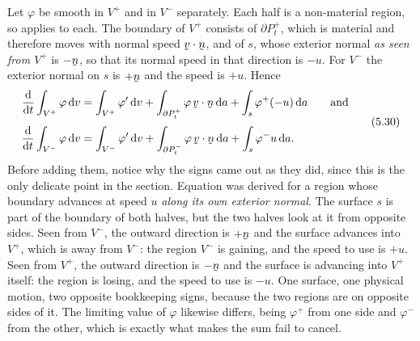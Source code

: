 Let $\varphi$ be smooth in $V^{+}$ and in $V^{-}$ separately. Each half is
a non-material region, so  applies to each. The boundary of
$V^{+}$ consists of $\partial P_{t}^{+}$, which is material and therefore
moves with normal speed $\ip\bv\bn$, and of $s$, whose exterior normal
\emph{as seen from $V^{+}$} is $-\bn$, so that its normal speed in that
direction is $-u$. For $V^{-}$ the exterior normal on $s$ is $+\bn$ and
the speed is $+u$. Hence
\begin{equation}
\begin{aligned}
   \frac{\dl}{\dl t}\int_{V^{+}}\varphi\,\dl v
   &=\int_{V^{+}}\varphi'\,\dl v
    +\int_{\partial P^{+}_{t}}\varphi\,\ip\bv\bn\,\dl a
    +\int_{s}\varphi^{+}(-u)\,\dl a
   \qquad\text{and}\\[1mm]
   \frac{\dl}{\dl t}\int_{V^{-}}\varphi\,\dl v
   &=\int_{V^{-}}\varphi'\,\dl v
    +\int_{\partial P^{-}_{t}}\varphi\,\ip\bv\bn\,\dl a
    +\int_{s}\varphi^{-}u\,\dl a .
\end{aligned}
   \tag{5.30}\label{eq:5.30}
\end{equation}
Before adding them, notice why the signs came out as they did, since this
is the only delicate point in the section. Equation  was derived
for a region whose boundary advances at speed $u$ \emph{along its own
exterior normal}. The surface $s$ is part of the boundary of both halves,
but the two halves look at it from opposite sides. Seen from $V^{-}$, the
outward direction is $+\bn$ and the surface advances into $V^{+}$, which
is away from $V^{-}$: the region $V^{-}$ is gaining, and the speed to use
is $+u$. Seen from $V^{+}$, the outward direction is $-\bn$ and the
surface is advancing into $V^{+}$ itself: the region is losing, and the
speed to use is $-u$. One surface, one physical motion, two opposite
bookkeeping signs, because the two regions are on opposite sides of it.
The limiting value of $\varphi$ likewise differs, being $\varphi^{+}$ from
one side and $\varphi^{-}$ from the other, which is exactly what makes the
sum fail to cancel.

